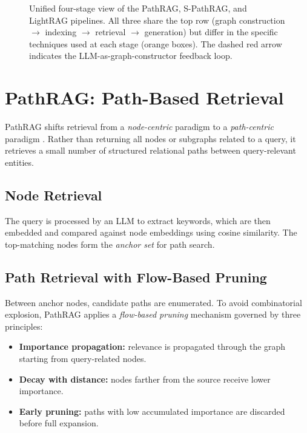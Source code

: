 \documentclass[12pt,a4paper,oneside]{report}
\begin{document}
\begin{figure}[H]
{{%
}%
}
\caption{Unified four-stage view of the PathRAG, S-PathRAG, and LightRAG
         pipelines. All three share the top row (graph construction
         $\rightarrow$ indexing $\rightarrow$ retrieval $\rightarrow$
         generation) but differ in the specific techniques used at each
         stage (orange boxes). The dashed red arrow indicates the
         LLM-as-graph-constructor feedback loop.}
\label{fig:pipeline}
\end{figure}

\section{PathRAG: Path-Based Retrieval}

PathRAG shifts retrieval from a \emph{node-centric} paradigm to a
\emph{path-centric} paradigm \citep{chen2025pathrag}. Rather than returning
all nodes or subgraphs related to a query, it retrieves a small number of
structured relational paths between query-relevant entities.

\subsection{Node Retrieval}
The query is processed by an LLM to extract keywords, which are then embedded
and compared against node embeddings using cosine similarity. The
top-matching nodes form the \emph{anchor set} for path search.

\subsection{Path Retrieval with Flow-Based Pruning}
Between anchor nodes, candidate paths are enumerated. To avoid combinatorial
explosion, PathRAG applies a \emph{flow-based pruning} mechanism governed by
three principles:
\begin{itemize}[leftmargin=2em,itemsep=2pt]
    \item \textbf{Importance propagation:} relevance is propagated through
          the graph starting from query-related nodes.
    \item \textbf{Decay with distance:} nodes farther from the source
          receive lower importance.
    \item \textbf{Early pruning:} paths with low accumulated importance are
          discarded before full expansion.
\end{itemize}
\end{document}
